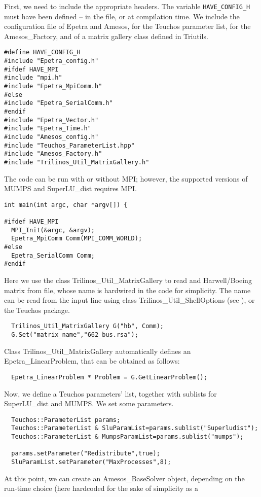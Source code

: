 \documentclass[11pt]{SANDreport}
\begin{document}
First, we need to include the appropriate headers. The variable
\verb!HAVE_CONFIG_H! must have been defined -- in the file, or at
compilation time. We include the configuration file of Epetra and
Amesos, for the Teuchos parameter list, for the Amesos\_Factory, and of
a matrix gallery class defined in Triutils.
\begin{verbatim}
#define HAVE_CONFIG_H
#include "Epetra_config.h"
#ifdef HAVE_MPI
#include "mpi.h"
#include "Epetra_MpiComm.h"
#else
#include "Epetra_SerialComm.h"
#endif
#include "Epetra_Vector.h"
#include "Epetra_Time.h"
#include "Amesos_config.h"
#include "Teuchos_ParameterList.hpp"
#include "Amesos_Factory.h"
#include "Trilinos_Util_MatrixGallery.h"
\end{verbatim}
The code can be run with or without MPI; however, the supported versions
of MUMPS and SuperLU\_dist requires MPI.
\begin{verbatim}
int main(int argc, char *argv[]) {

#ifdef HAVE_MPI
  MPI_Init(&argc, &argv);
  Epetra_MpiComm Comm(MPI_COMM_WORLD);
#else
  Epetra_SerialComm Comm;
#endif
\end{verbatim}
Here we use the class Trilinos\_Util\_MatrixGallery to read and
Harwell/Boeing matrix from file, whose name is hardwired in the code for
simplicity. The name can be read from the input line using class
Trilinos\_Util\_ShellOptions (see \cite{Trilinos-tutorial}), or the
Teuchos package.
\begin{verbatim}
  Trilinos_Util_MatrixGallery G("hb", Comm);
  G.Set("matrix_name","662_bus.rsa");
\end{verbatim}
Class Trilinos\_Util\_MatrixGallery automatically defines an
Epetra\_LinearProblem, that can be obtained as follows:
\begin{verbatim}  
  Epetra_LinearProblem * Problem = G.GetLinearProblem();
\end{verbatim}
Now, we define a Teuchos parameters' list, together with sublists for
SuperLU\_dist and MUMPS. We set some parameters.
\begin{verbatim}  
  Teuchos::ParameterList params;
  Teuchos::ParameterList & SluParamList=params.sublist("Superludist");
  Teuchos::ParameterList & MumpsParamList=params.sublist("mumps");

  params.setParameter("Redistribute",true);
  SluParamList.setParameter("MaxProcesses",8);
\end{verbatim}
At this point, we can create an Amesos\_BaseSolver object, depending on
the run-time choice (here hardcoded for the sake of simplicity as a
\end{document}
